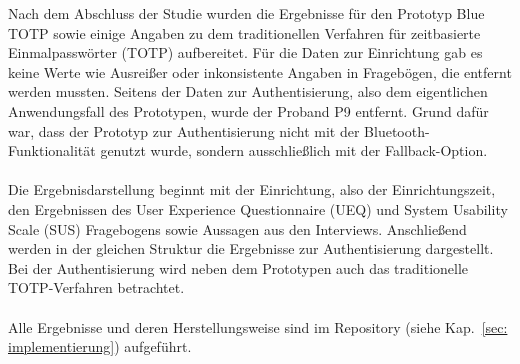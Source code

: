 Nach dem Abschluss der Studie wurden die Ergebnisse für den Prototyp  \glqq Blue TOTP\grqq{} sowie einige Angaben zu dem traditionellen Verfahren für zeitbasierte Einmalpasswörter (TOTP) aufbereitet. Für die Daten zur Einrichtung gab es keine Werte wie Ausreißer oder inkonsistente Angaben in Fragebögen, die entfernt werden mussten. Seitens der Daten zur Authentisierung, also dem eigentlichen Anwendungsfall des Prototypen, wurde der Proband P9 entfernt. Grund dafür war, dass der Prototyp zur Authentisierung nicht mit der Bluetooth-Funktionalität genutzt wurde, sondern ausschließlich mit der Fallback-Option.
\\\\
Die Ergebnisdarstellung beginnt mit der Einrichtung, also der Einrichtungszeit, den Ergebnissen des User Experience Questionnaire (UEQ) und System Usability Scale (SUS) Fragebogens sowie Aussagen aus den Interviews. Anschließend werden in der gleichen Struktur die Ergebnisse zur Authentisierung dargestellt. Bei der Authentisierung wird neben dem Prototypen auch das traditionelle TOTP-Verfahren betrachtet.
\\\\
Alle Ergebnisse und deren Herstellungsweise sind im Repository (siehe Kap.~\ref{sec: implementierung}) aufgeführt.
